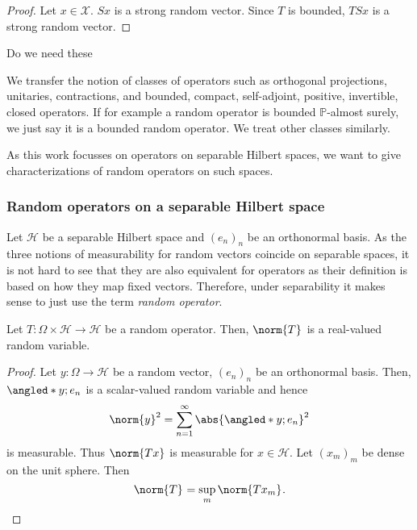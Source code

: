 \begin{proof}
    Let \( x \in \mathcal{X} \). \( Sx \) is a strong random vector. Since \( T \) is bounded, \( TSx \) is a strong random vector.
\end{proof}


\begin{thm}
    Do we need these
\end{thm}



\begin{defn}
    We transfer the notion of classes of operators such as orthogonal projections, unitaries, contractions, and bounded, compact, self-adjoint, positive, invertible, closed operators. If for example a random operator is bounded \( \mathbb{P} \)-almost surely, we just say it is a bounded random operator. We treat other classes similarly.
\end{defn}


As this work focusses on operators on separable Hilbert spaces, we want to give characterizations of random operators on such spaces.


\subsubsection{Random operators on a separable Hilbert space}
Let \( \mathcal{H} \) be a separable Hilbert space and \( (e_n)_n \) be an orthonormal basis.
As the three notions of measurability for random vectors coincide on separable spaces, it is not hard to see that they are also equivalent for operators as their definition is based on how they map fixed vectors. Therefore, under separability it makes sense to just use the term \emph{random operator}.


\begin{thm}
    Let \( T: \Omega \times \mathcal{H} \to \mathcal{H} \) be a random operator. Then, \( \norm{T}_{ } \) is a real-valued random variable.
\end{thm}

\begin{proof}
    Let \( y: \Omega \to \mathcal{H} \) be a random vector, \( \left(e_n\right)_n \) be an orthonormal basis. Then, \( \angled*{y;e_n} \) is a scalar-valued random variable and hence 
    \[ \norm{y}_{}^{2} = \sum_{n=1}^{\infty} \abs{\angled*{y;e_n}}^{2} \] 
    is measurable. Thus \( \norm{Tx}_{} \) is measurable for \( x \in \mathcal{H} \). Let \( \left(x_m\right)_m \) be dense on the unit sphere. Then 
    \[ \norm{T}_{}= \sup_{m} \norm{Tx_m}_{}. \]
\end{proof}


